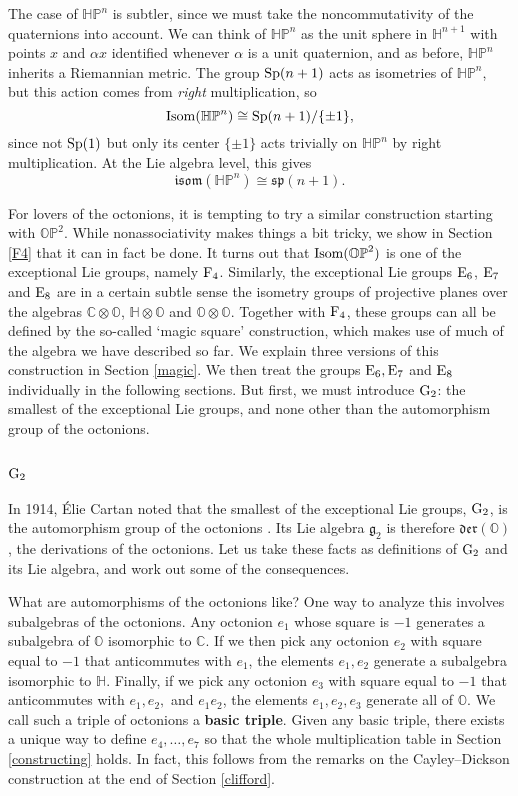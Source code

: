 \documentclass[12pt]{article}
\newcommand\C{{\mathbb C}}
\renewcommand\H{{\mathbb H}}
\renewcommand\O{{\mathbb O}}
\newcommand\HP{{\mathbb {HP}}}
\newcommand\OP{{\mathbb {OP}}}
\newcommand{\Sp}{{\rm Sp}}
\newcommand{\E}{{\rm E}}
\newcommand{\F}{{\rm F}}
\newcommand{\G}{{\rm G}}
\newcommand{\symp}{{\mathfrak {sp}}}
\newcommand{\g}{{\mathfrak {g}}}
\newcommand{\isom}{{\mathfrak {isom}}}
\newcommand{\Isom}{{\rm Isom}}
\newcommand{\Der}{{\mathfrak {der}}}
\newcommand{\tensor}{\otimes}
\newcommand{\iso}{\cong}
\begin{document}
The case of $\HP^n$ is subtler, since we must take the noncommutativity
of the quaternions into account.   We can think of $\HP^n$ as the unit
sphere in $\H^{n+1}$ with points $x$ and $\alpha x$ identified whenever
$\alpha$ is a unit quaternion, and as before, $\HP^n$ inherits a
Riemannian metric.  The group $\Sp(n+1)$ acts as isometries of $\HP^n$,
but this action comes from {\it right} multiplication, so 
\[       \Isom(\HP^n) \iso \Sp(n+1)/\{ \pm 1 \},  \]
since not $\Sp(1)$ but only its center $\{\pm 1\}$ acts trivially
on $\HP^n$ by right multiplication.  At the Lie algebra level, this 
gives
\[       \isom(\HP^n) \iso \symp(n+1) . \]

For lovers of the octonions, it is tempting to try a similar
construction starting with $\OP^2$.  While nonassociativity makes things
a bit tricky, we show in Section \ref{F4} that it can in fact be done. 
It turns out that $\Isom(\OP^2)$ is one of the exceptional Lie groups,
namely $\F_4$.  Similarly, the exceptional Lie groups $\E_6$, $\E_7$
and $\E_8$ are in a certain subtle sense the isometry groups of
projective planes over the algebras $\C \tensor \O$, $\H \tensor \O$ and
$\O \tensor \O$.  Together with $\F_4$, these groups can all be 
defined by the so-called `magic square' construction, which makes use of
much of the algebra we have described so far.  We explain three versions
of this construction in Section \ref{magic}.  We then treat the groups
$\E_6, \E_7$ and $\E_8$ individually in the following sections.  But
first, we must introduce $\G_2$: the smallest of the exceptional Lie
groups, and none other than the automorphism group of the octonions.

\subsection{$\G_2$}       \label{G2}   
 
In 1914, \'Elie Cartan noted that the smallest of the exceptional Lie 
groups, $\G_2$, is the automorphism group of the octonions 
\cite{Cartan}.  Its Lie algebra $\g_2$ is therefore $\Der(\O)$, the 
derivations of the octonions.  Let us take these facts as definitions of 
$\G_2$ and its Lie algebra, and work out some of the consequences.   
   
What are automorphisms of the octonions like?  One way to analyze this
involves subalgebras of the octonions.  Any octonion $e_1$ whose square
is $-1$ generates a subalgebra of $\O$ isomorphic to $\C$. If we then
pick any octonion $e_2$ with square equal to $-1$ that anticommutes with
$e_1$, the elements $e_1,e_2$ generate a subalgebra isomorphic to $\H$.
Finally, if we pick any octonion $e_3$ with square equal to $-1$ that
anticommutes with $e_1,e_2,$ and $e_1e_2$, the elements $e_1,e_2,e_3$
generate all of $\O$.  We call such a triple of octonions a {\bf basic
triple}.  Given any basic triple, there exists a unique way to define
$e_4, \dots , e_7$ so that the whole multiplication table in Section
\ref{constructing} holds.  In fact, this follows from the remarks on the
Cayley--Dickson construction at the end of Section \ref{clifford}.
   
\end{document}
